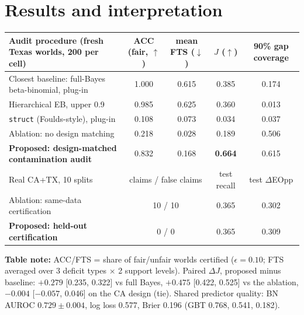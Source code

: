\documentclass[11pt,a4paper]{article}
\begin{document}
\section{Results and interpretation}
\vspace{-2pt}\begin{center}\small
\begin{tabularx}{\linewidth}{Xcccc}
\toprule
Audit procedure (fresh Texas worlds, 200 per cell) & ACC (fair, $\uparrow$) & mean FTS ($\downarrow$) & $J$ ($\uparrow$) & 90\% gap coverage\\
\midrule
Closest baseline: full-Bayes beta-binomial, plug-in & 1.000 & 0.615 & 0.385 & 0.174\\
Hierarchical EB, upper 0.9 & 0.985 & 0.625 & 0.360 & 0.013\\
\texttt{struct} (Foulds-style), plug-in & 0.108 & 0.073 & 0.034 & 0.037\\
Ablation: no design matching & 0.218 & 0.028 & 0.189 & 0.506\\
\textbf{Proposed: design-matched contamination audit} & 0.832 & 0.168 & \textbf{0.664} & 0.615\\
\midrule
Real CA+TX, 10 splits & \multicolumn{2}{c}{claims / false claims} & test recall & test $\Delta$EOpp\\
Ablation: same-data certification & \multicolumn{2}{c}{10 / 10} & 0.365 & 0.302\\
\textbf{Proposed: held-out certification} & \multicolumn{2}{c}{0 / 0} & 0.365 & 0.309\\
\bottomrule
\end{tabularx}
\end{center}
{\small \textbf{Table note:} ACC/FTS = share of fair/unfair worlds certified ($\epsilon=0.10$; FTS averaged over 3
deficit types $\times$ 2 support levels). Paired $\Delta J$, proposed minus baseline: $+0.279$ [0.235, 0.322] vs full
Bayes, $+0.475$ [0.422, 0.525] vs the ablation, $-0.004$ [$-0.057$, 0.046] on the CA design (tie). Shared predictor
quality: BN AUROC $0.729\pm0.004$, log loss 0.577, Brier 0.196 (GBT 0.768, 0.541, 0.182).}
\end{document}
